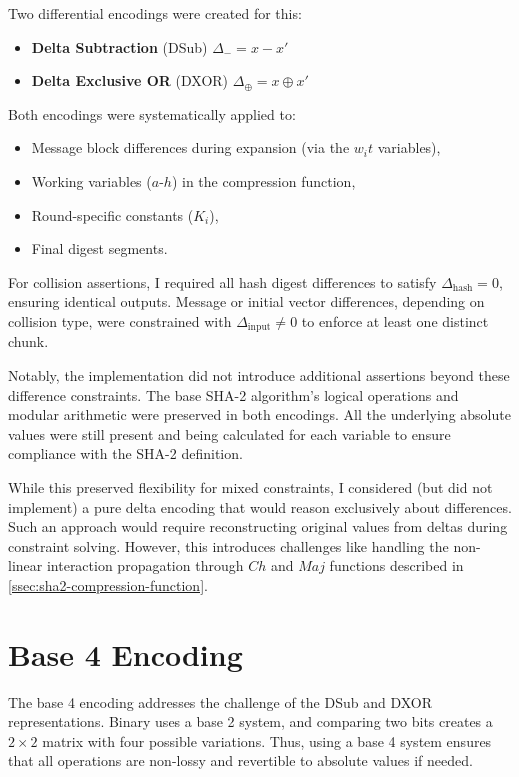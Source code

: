 \documentclass[a4paper]{report}
\begin{document}
Two differential encodings were created for this:
\begin{itemize}
	\item \textbf{Delta Subtraction} (DSub) $\Delta_- = x - x'$
	\item \textbf{Delta Exclusive OR} (DXOR) $\Delta_\oplus = x \oplus x'$
\end{itemize}

Both encodings were systematically applied to:
\begin{itemize}
    \item Message block differences during expansion (via the $w_it$ variables),
    \item Working variables ($a$-$h$) in the compression function,
    \item Round-specific constants ($K_i$),
    \item Final digest segments.
\end{itemize}

For collision assertions, I required all hash digest differences to satisfy $\Delta_{\text{hash}} = 0$, ensuring identical outputs.
Message or initial vector differences, depending on collision type, were constrained with $\Delta_{\text{input}} \neq 0$ to enforce at least one distinct chunk.

Notably, the implementation did not introduce additional assertions beyond these difference constraints.
The base SHA-2 algorithm's logical operations and modular arithmetic were preserved in both encodings.
All the underlying absolute values were still present and being calculated for each variable to ensure compliance with the SHA-2 definition.

While this preserved flexibility for mixed constraints, I considered (but did not implement) a pure delta encoding that would reason exclusively about differences.
Such an approach would require reconstructing original values from deltas during constraint solving.
However, this introduces challenges like handling the non-linear interaction propagation through $Ch$ and $Maj$ functions described in \ref{ssec:sha2-compression-function}.

\pagebreak
\section{Base 4 Encoding}
\label{ssec:base4-encoding}

The base 4 encoding addresses the challenge of the DSub and DXOR representations.
Binary uses a base 2 system, and comparing two bits creates a $2 \times 2$ matrix with four possible variations.
Thus, using a base 4 system ensures that all operations are non-lossy and revertible to absolute values if needed.
\end{document}
